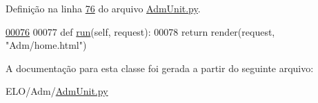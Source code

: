 Definição na linha \hyperlink{AdmUnit_8py_source_l00076}{76} do arquivo \hyperlink{AdmUnit_8py_source}{Adm\-Unit.\-py}.


\begin{DoxyCode}
\hypertarget{classAdm_1_1AdmUnit_1_1UiAdm_l00076}{}\hyperlink{classAdm_1_1AdmUnit_1_1UiAdm_a88df3b19b48d71b2c0fc0b4557c71416}{00076} 
00077     \textcolor{keyword}{def }\hyperlink{classAdm_1_1AdmUnit_1_1UiAdm_a88df3b19b48d71b2c0fc0b4557c71416}{run}(self, request):
00078         \textcolor{keywordflow}{return} render(request, \textcolor{stringliteral}{"Adm/home.html"})

\end{DoxyCode}


A documentação para esta classe foi gerada a partir do seguinte arquivo\-:\begin{DoxyCompactItemize}
\item 
E\-L\-O/\-Adm/\hyperlink{AdmUnit_8py}{Adm\-Unit.\-py}\end{DoxyCompactItemize}
